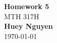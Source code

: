 \begin{titlepage}
    \begin{center}
    {\fontsize{40}{48}\selectfont \bfseries Homework 5} 
    \\\vspace{20pt}
    {\LARGE MTH 317H} \\
    \vspace{20pt}
    \textbf{Huey Nguyen}
    \vspace{8pt}
    \\\today
    \end{center}
\end{titlepage}
